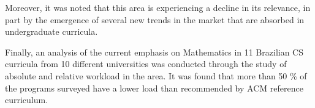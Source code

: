 \documentclass[conference]{IEEEtran}
\begin{document}
	Moreover, it was noted that this area is experiencing a decline in its relevance, in part by the emergence of several new trends in the market that are absorbed in undergraduate curricula.
	
	Finally, an analysis of the current emphasis on Mathematics in 11 Brazilian CS curricula from 10 different universities was conducted through the study of absolute and relative workload in the area. It was found that more than 50 \% of the programs surveyed have a lower load than recommended by ACM reference curriculum.
	
%
%



%
%
\end{document}
